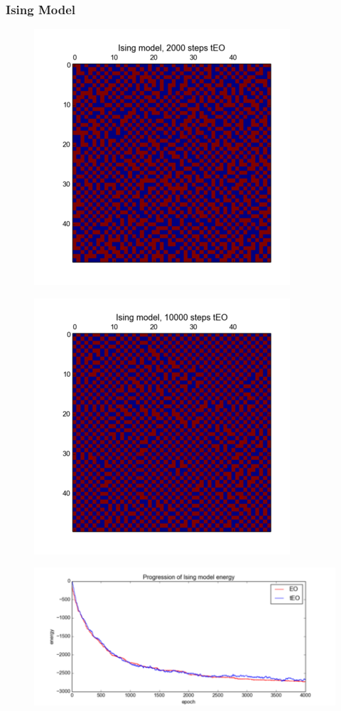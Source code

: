 \documentclass[12pt]{article}
\begin{document}
\frametitle{Ising Model}
\begin{figure}
  \includegraphics{2000}
\end{figure}
\begin{figure}
  \includegraphics{10000}
\end{figure}
\begin{figure}
  \includegraphics{ising_energy_unzoomed}
\end{figure}
\end{document}
